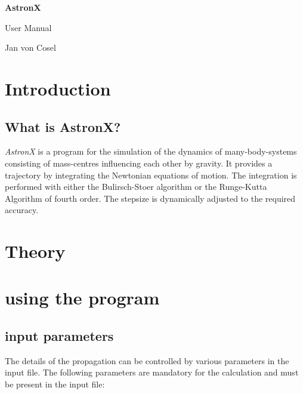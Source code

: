 \documentclass[paper=a4,pagesize,DIV=12,BCOR=12mm]{scrbook}
\begin{document}
\begin{titlepage}
\begin{center}


{\huge \bfseries AstronX}


{\LARGE User Manual}


Jan von Cosel


\end{center}
\end{titlepage}

\tableofcontents

\chapter{Introduction}

\section{What is AstronX?}

\textit{AstronX} is a program for the simulation of the dynamics of many-body-systems consisting of
mass-centres influencing each other by gravity. It provides a trajectory by integrating the Newtonian
equations of motion. The integration is performed with either the Bulirsch-Stoer algorithm or the Runge-Kutta
Algorithm of fourth order. The stepsize is dynamically adjusted to the required accuracy.

\chapter{Theory}

\chapter{using the program}

\section{input parameters}

The details of the propagation can be controlled by various parameters in the input file. The following
parameters are mandatory for the calculation and must be present in the input file:
\end{document}
